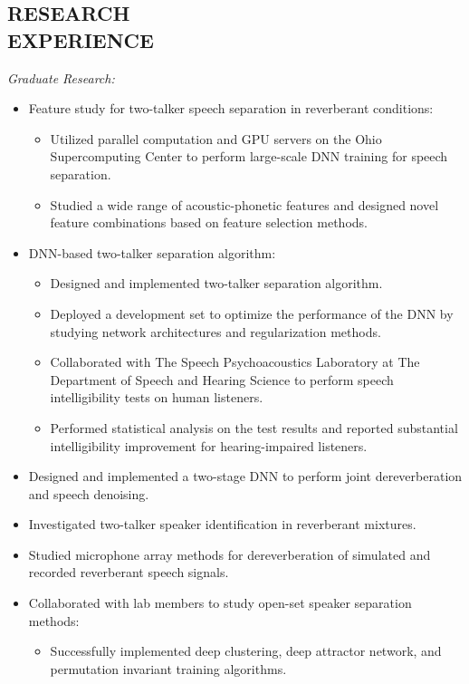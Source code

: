 \documentclass[margin, 10pt]{res}
\begin{document}
\begin{resume}
\section{RESEARCH \\ EXPERIENCE}
\textit{Graduate Research:}
\begin{itemize}\setlength\itemsep{-0.3em}
\item Feature study for two-talker speech separation in reverberant conditions:
	\begin{itemize}\setlength\itemsep{-0.3em}
	\item Utilized parallel computation and GPU servers on the Ohio Supercomputing Center to perform large-scale DNN training for speech separation.
	\item Studied a wide range of acoustic-phonetic features and designed novel feature combinations based on feature selection methods.
	\end{itemize}
\item DNN-based two-talker separation algorithm:
	\begin{itemize}\setlength\itemsep{-0.3em}
	\item Designed and implemented two-talker separation algorithm.
	\item Deployed a development set to optimize the performance of the DNN by studying network architectures and regularization methods.
	\item Collaborated with The Speech Psychoacoustics Laboratory at The Department of Speech and Hearing Science to perform speech intelligibility tests on human listeners.
	\item Performed statistical analysis on the test results and reported substantial intelligibility improvement for hearing-impaired listeners.
	\end{itemize}
\item Designed and implemented a two-stage DNN to perform joint dereverberation and speech denoising.
\item Investigated two-talker speaker identification in reverberant mixtures.
\item Studied microphone array methods for dereverberation of simulated and recorded reverberant speech signals.
\item Collaborated with lab members to study open-set speaker separation methods:
	\begin{itemize}\setlength\itemsep{-0.3em}
	\item Successfully implemented deep clustering, deep attractor network, and permutation invariant training algorithms.

\end{itemize}
\end{itemize}
\end{resume}
\end{document}
